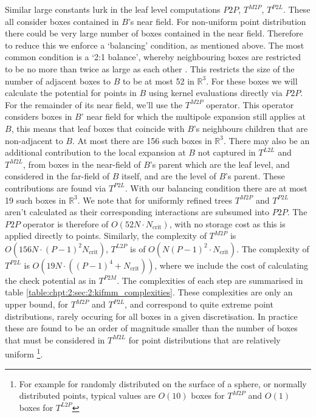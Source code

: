 Similar large constants lurk in the leaf level computations $P2P$, $T^{M2P}$, $T^{P2L}$. These all consider boxes contained in $B$'s near field. For non-uniform point distribution there could be very large number of boxes contained in the near field. Therefore to reduce this we enforce a `balancing' condition, as mentioned above. The most common condition is a `2:1 balance', whereby neighbouring boxes are restricted to be no more than twice as large as each other \cite{malhotra2015pvfmm}. This restricts the size of the number of adjacent boxes to $B$ to be at most 52 in $\mathbb{R}^3$. For these boxes we will calculate the potential for points in $B$ using kernel evaluations directly via $P2P$. For the remainder of its near field, we'll use the $T^{M2P}$ operator. This operator considers boxes in $B$' near field for which the multipole expansion still applies at $B$, this means that leaf boxes that coincide with $B$'s neighbours children that are non-adjacent to $B$. At most there are 156 such boxes in $\mathbb{R}^3$. There may also be an additional contribution to the local expansion at $B$ not captured in $T^{L2L}$ and $T^{M2L}$, from boxes in the near-field of $B$'s parent which are the leaf level, and considered in the far-field of $B$ itself, and are the level of $B$'s parent. These contributions are found via $T^{P2L}$. With our balancing condition there are at most 19 such boxes in $\mathbb{R}^3$. We note that for uniformly refined trees $T^{M2P}$ and $T^{P2L}$ aren't calculated as their corresponding interactions are subsumed into $P2P$. The $P2P$ operator is therefore of $O(52 N \cdot N_{\text{crit}})$, with no storage cost as this is applied directly to points. Similarly, the complexity of $T^{M2P}$ is $O(156 N \cdot (P-1)^2 N_\text{crit})$, $T^{L2P}$ is of $O(N (P-1)^2 \cdot N_\text{crit})$. The complexity of $T^{P2L}$ is $O(19 N \cdot ((P-1)^4 + N_\text{crit}))$, where we include the cost of calculating the check potential as in $T^{P2M}$. The complexities of each step are summarised in table \ref{table:chpt:2:sec:2:kifmm_complexities}. These complexities are only an upper bound, for $T^{M2P}$ and $T^{P2L}$, and correspond to quite extreme point distributions, rarely occuring for all boxes in a given discretisation. In practice these are found to be an order of magnitude smaller than the number of boxes that must be considered in $T^{M2L}$ for point distributions that are relatively uniform \footnote{For example for randomly distributed on the surface of a sphere, or normally distributed points, typical values are $O(10)$ boxes for $T^{M2P}$ and $O(1)$ boxes for $T^{L2P}$}.

